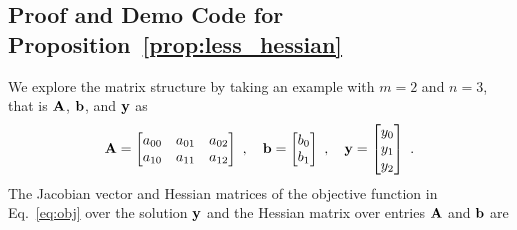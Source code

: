 \subsection{Proof and Demo Code for Proposition~\ref{prop:less_hessian}}
We explore the matrix structure by taking an example with $m=2$ and $n=3$, that is $\mathbf{A}$, $\mathbf{b}$, and $\mathbf{y}$ as
%
\begin{equation}
\mathbf{A} =
\begin{bmatrix}
a_{00} & a_{01} & a_{02} \\
a_{10} & a_{11} & a_{12}
\end{bmatrix}\ ,
\quad
\mathbf{b} =
\begin{bmatrix}
b_0 \\
b_1
\end{bmatrix}\ , \\
\quad
\mathbf{y} =
\begin{bmatrix}
y_0 \\
y_1 \\
y_2
\end{bmatrix}\ .
\end{equation}
%
The Jacobian vector and Hessian matrices of the objective function in Eq.~\eqref{eq:obj} over the solution $\mathbf{y}$ and the Hessian matrix over entries $\mathbf{A}$ and $\mathbf{b}$ are
